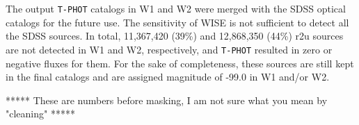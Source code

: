 \documentclass[apj,iop]{emulateapj}
\begin{document}
The output {\tt T-PHOT} catalogs in W1 and W2 were merged with the SDSS optical catalogs for the future use. The sensitivity of WISE is not sufficient to detect all the SDSS sources. In total, 11,367,420 (39\%) and 12,868,350 (44\%) r2u sources are not detected in W1 and W2, respectively, and {\tt T-PHOT} resulted in zero or negative fluxes for them. For the sake of completeness, these sources are still kept in the final catalogs and are assigned magnitude of -99.0 in W1 and/or W2.

*****
These are numbers before masking, I am not sure what you mean by "cleaning"
*****



 
 
\end{document}
